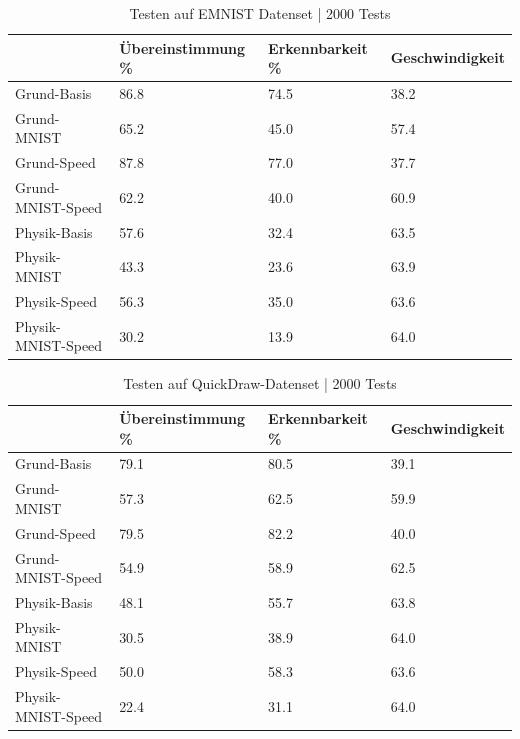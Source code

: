 \begin{table}[!ht]
    \centering
    \caption{Testen auf EMNIST Datenset | 2000 Tests}
    \begin{tabular}{|l|l|l|l|}
    \hline
        ~ & Übereinstimmung \% & Erkennbarkeit \% & Geschwindigkeit \\ \hline
        Grund-Basis & 86.8 & 74.5 & 38.2 \\ \hline
        Grund-MNIST & 65.2 & 45.0 & 57.4 \\ \hline
        Grund-Speed & 87.8 & 77.0 & 37.7 \\ \hline
        Grund-MNIST-Speed & 62.2 & 40.0 & 60.9 \\ \hline
        Physik-Basis & 57.6 & 32.4 & 63.5 \\ \hline
        Physik-MNIST & 43.3 & 23.6 & 63.9 \\ \hline
        Physik-Speed & 56.3 & 35.0 & 63.6 \\ \hline
        Physik-MNIST-Speed & 30.2 & 13.9 & 64.0 \\ \hline
    \end{tabular}
    \label{tab:EMNIST}
\end{table}

\begin{table}[!ht]
    \centering
    \caption{Testen auf QuickDraw-Datenset | 2000 Tests}
    \begin{tabular}{|l|l|l|l|}
    \hline
        ~ & Übereinstimmung \% & Erkennbarkeit \% & Geschwindigkeit \\ \hline
        Grund-Basis & 79.1 & 80.5 & 39.1 \\ \hline
        Grund-MNIST & 57.3 & 62.5 & 59.9 \\ \hline
        Grund-Speed & 79.5 & 82.2 & 40.0 \\ \hline
        Grund-MNIST-Speed & 54.9 & 58.9 & 62.5 \\ \hline
        Physik-Basis & 48.1 & 55.7 & 63.8 \\ \hline
        Physik-MNIST & 30.5 & 38.9 & 64.0 \\ \hline
        Physik-Speed & 50.0 & 58.3 & 63.6 \\ \hline
        Physik-MNIST-Speed & 22.4 & 31.1 & 64.0 \\ \hline
    \end{tabular}
    \label{tab:Quickdraw}
\end{table}

\newpage

